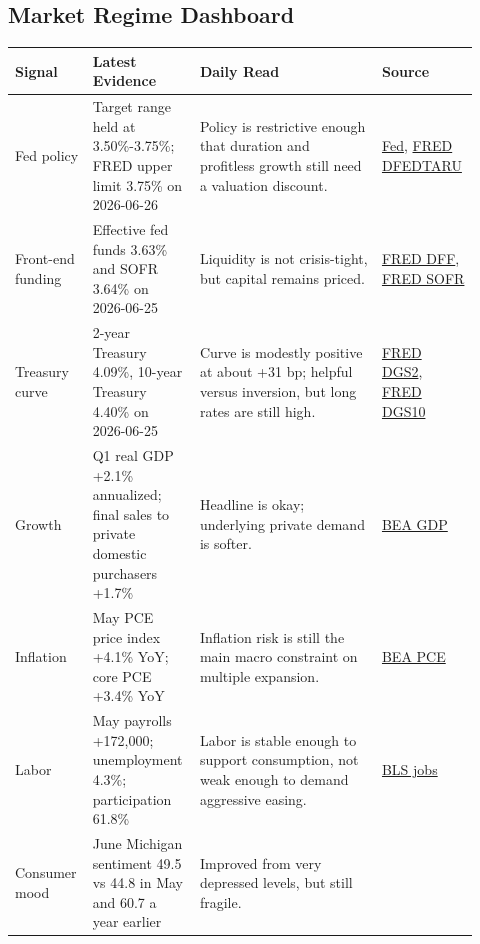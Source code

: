 \documentclass[
  9pt,
]{article}
\begin{document}
\hypertarget{market-regime-dashboard}{%
\subsection{Market Regime Dashboard}\label{market-regime-dashboard}}

\begin{longtable}[]{@{}L{0.14\linewidth}L{0.22\linewidth}L{0.38\linewidth}L{0.18\linewidth}@{}}
\toprule
Signal & Latest Evidence & Daily Read & Source \\
\midrule
\endhead
Fed policy & Target range held at 3.50\%-3.75\%; FRED upper limit 3.75\%
on 2026-06-26 & Policy is restrictive enough that duration and
profitless growth still need a valuation discount. &
\href{https://www.federalreserve.gov/newsevents/pressreleases/monetary20260617a.htm}{Fed},
\href{https://fred.stlouisfed.org/series/DFEDTARU}{FRED DFEDTARU} \\
Front-end funding & Effective fed funds 3.63\% and SOFR 3.64\% on
2026-06-25 & Liquidity is not crisis-tight, but capital remains priced.
& \href{https://fred.stlouisfed.org/series/DFF}{FRED DFF},
\href{https://fred.stlouisfed.org/series/SOFR}{FRED SOFR} \\
Treasury curve & 2-year Treasury 4.09\%, 10-year Treasury 4.40\% on
2026-06-25 & Curve is modestly positive at about +31 bp; helpful versus
inversion, but long rates are still high. &
\href{https://fred.stlouisfed.org/series/DGS2}{FRED DGS2},
\href{https://fred.stlouisfed.org/series/DGS10}{FRED DGS10} \\
Growth & Q1 real GDP +2.1\% annualized; final sales to private domestic
purchasers +1.7\% & Headline is okay; underlying private demand is
softer. &
\href{https://www.bea.gov/news/2026/gdp-third-estimate-industries-corporate-profits-state-gdp-and-state-personal-income-1st}{BEA
GDP} \\
Inflation & May PCE price index +4.1\% YoY; core PCE +3.4\% YoY &
Inflation risk is still the main macro constraint on multiple expansion.
&
\href{https://www.bea.gov/news/2026/personal-income-and-outlays-may-2026}{BEA
PCE} \\
Labor & May payrolls +172,000; unemployment 4.3\%; participation 61.8\%
& Labor is stable enough to support consumption, not weak enough to
demand aggressive easing. &
\href{https://www.bls.gov/news.release/empsit.nr0.htm}{BLS jobs} \\
Consumer mood & June Michigan sentiment 49.5 vs 44.8 in May and 60.7 a
year earlier & Improved from very depressed levels, but still fragile. &

\end{longtable}
\end{document}
